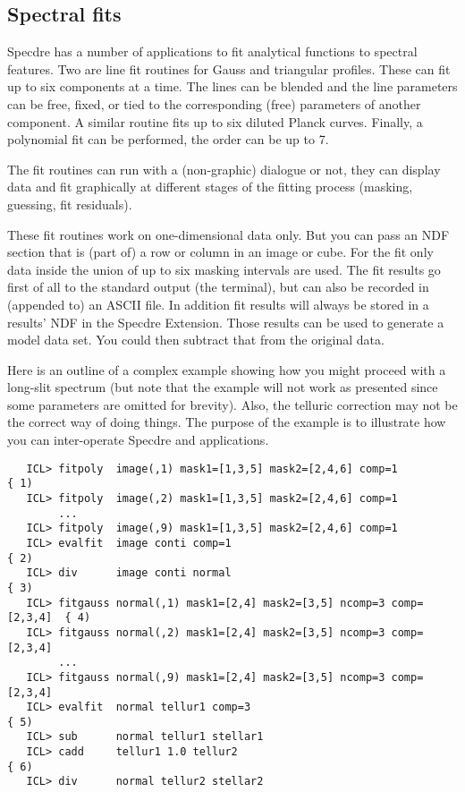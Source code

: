 
\subsection{\label{specdrespecfit}Spectral fits}

   Specdre has a number of applications to fit analytical functions to
   spectral features. Two are line fit routines for Gauss and triangular
   profiles. These can fit up to six components at a time. The lines can
   be blended and the line parameters can be free, fixed, or tied to the
   corresponding (free) parameters of another component. A similar
   routine fits up to six diluted Planck curves.  Finally, a polynomial
   fit can be performed, the order can be up to 7.

   The fit routines can run with a (non-graphic) dialogue or not, they
   can display data and fit graphically at different stages of the
   fitting process (masking, guessing, fit residuals).

   These fit routines work on one-dimensional data only. But you can
   pass an NDF section that is (part of) a row or column in an image or
   cube. For the fit only data inside the union of up to six masking
   intervals are used. The fit results go first of all to the standard
   output (the terminal), but can also be recorded in (appended to) an
   ASCII file. In addition fit results will always be stored in a
   results' NDF in the Specdre Extension. Those results can be used to
   generate a model data set. You could then subtract that from the
   original data.

   Here is an outline of a complex example showing how you might proceed
   with a long-slit spectrum (but note that the example will not work 
   as presented since some parameters are omitted for brevity).  Also,
   the telluric correction may not be the correct way of doing
   things. The purpose of the example is to illustrate how you can
   inter-operate Specdre and  applications.

\begin{verbatim}
   ICL> fitpoly  image(,1) mask1=[1,3,5] mask2=[2,4,6] comp=1             { 1)
   ICL> fitpoly  image(,2) mask1=[1,3,5] mask2=[2,4,6] comp=1
        ...
   ICL> fitpoly  image(,9) mask1=[1,3,5] mask2=[2,4,6] comp=1
   ICL> evalfit  image conti comp=1                                       { 2)
   ICL> div      image conti normal                                       { 3)
   ICL> fitgauss normal(,1) mask1=[2,4] mask2=[3,5] ncomp=3 comp=[2,3,4]  { 4)
   ICL> fitgauss normal(,2) mask1=[2,4] mask2=[3,5] ncomp=3 comp=[2,3,4]
        ...
   ICL> fitgauss normal(,9) mask1=[2,4] mask2=[3,5] ncomp=3 comp=[2,3,4]
   ICL> evalfit  normal tellur1 comp=3                                    { 5)
   ICL> sub      normal tellur1 stellar1
   ICL> cadd     tellur1 1.0 tellur2                                      { 6)
   ICL> div      normal tellur2 stellar2
\end{verbatim}

